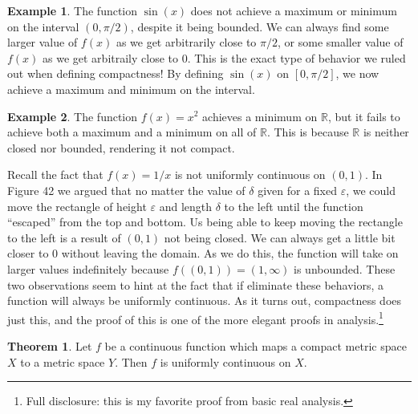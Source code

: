 \documentclass{article}
\newcommand{\R}{\mathbb{R}}
\theoremstyle{definition}
\newtheorem{theorem}{Theorem}[section]
\newtheorem{example}{Example}[section]
\begin{document}
	\begin{example}
		The function $ \sin(x) $ does not achieve a maximum or minimum on the interval $ (0,\pi/2) $, despite it being bounded. We can always find some larger value of $ f(x) $ as we get arbitrarily close to $ \pi/2 $, or some smaller value of $ f(x) $ as we get arbitraily close to $ 0 $. This is the exact type of behavior we ruled out when defining compactness! By defining $ \sin(x) $ on $ [0,\pi/2] $, we now achieve a maximum and minimum on the interval.  
	\end{example}
	\begin{example}
		The function $ f(x)=x^2 $ achieves a minimum on $ \R $, but it fails to achieve both a maximum and a minimum on all of $ \R $. This is because $ \R $ is neither closed nor bounded, rendering it not compact. 
	\end{example}
	Recall the fact that $ f(x)=1/x $ is not uniformly continuous on $ (0,1) $. In Figure 42 we argued that no matter the value of $ \delta $ given for a fixed $ \varepsilon $, we could move the rectangle of height $ \varepsilon $ and length $ \delta $ to the left until the function ``escaped'' from the top and bottom. Us being able to keep moving the rectangle to the left is a result of $ (0,1) $ not being closed. We can always get a little bit closer to $ 0 $ without leaving the domain. As we do this, the function will take on larger values indefinitely because $ f((0,1))=(1,\infty) $ is unbounded. These two observations seem to hint at the fact that if eliminate these behaviors, a function will always be uniformly continuous. As it turns out, compactness does just this, and the proof of this is one of the more elegant proofs in analysis.\footnote{Full disclosure: this is my favorite proof from basic real analysis.} 
	\begin{theorem}
		Let $ f $ be a continuous function which maps a compact metric space $ X $ to a metric space $ Y $. Then $ f $ is uniformly continuous on $ X $.
	\end{theorem}
\end{document}
